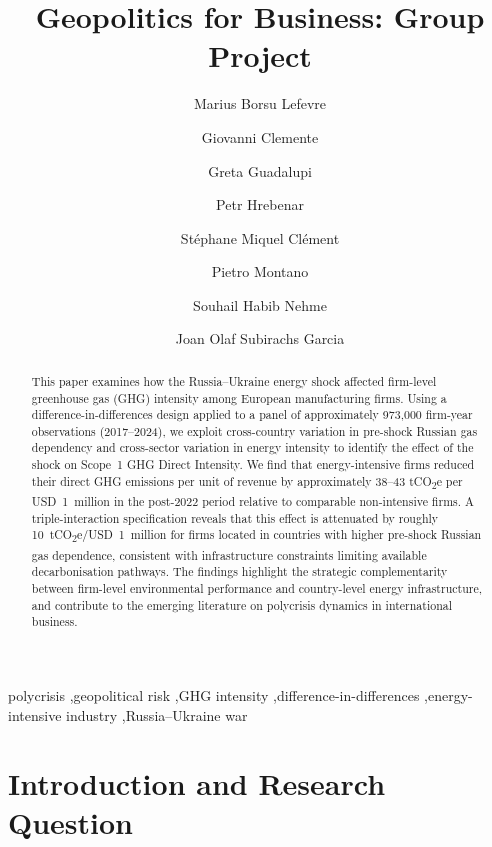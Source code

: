 \documentclass[authoryear,preprint,review,12pt]{elsarticle}
\begin{document}
\begin{frontmatter}

\title{Geopolitics for Business: Group Project}

\author[inst1]{Marius Borsu Lefevre}
\author[inst1]{Giovanni Clemente}
\author[inst1]{Greta Guadalupi}
\author[inst1]{Petr Hrebenar}
\author[inst1]{Stéphane Miquel Clément}
\author[inst1]{Pietro Montano}
\author[inst1]{Souhail Habib Nehme}
\author[inst1]{Joan Olaf Subirachs Garcia}

\address[inst1]{Data Group 2, [Institution Name], [City], [Country]}

\begin{abstract}
This paper examines how the Russia--Ukraine energy shock affected firm-level greenhouse gas (GHG) intensity among European manufacturing firms. Using a difference-in-differences design applied to a panel of approximately 973,000 firm-year observations (2017--2024), we exploit cross-country variation in pre-shock Russian gas dependency and cross-sector variation in energy intensity to identify the effect of the shock on Scope~1 GHG Direct Intensity. We find that energy-intensive firms reduced their direct GHG emissions per unit of revenue by approximately 38--43 tCO\textsubscript{2}e per USD~1~million in the post-2022 period relative to comparable non-intensive firms. A triple-interaction specification reveals that this effect is attenuated by roughly 10~tCO\textsubscript{2}e/USD~1~million for firms located in countries with higher pre-shock Russian gas dependence, consistent with infrastructure constraints limiting available decarbonisation pathways. The findings highlight the strategic complementarity between firm-level environmental performance and country-level energy infrastructure, and contribute to the emerging literature on polycrisis dynamics in international business.
\end{abstract}

\begin{keyword}
polycrisis \sep geopolitical risk \sep GHG intensity \sep difference-in-differences \sep energy-intensive industry \sep Russia--Ukraine war
\end{keyword}

\end{frontmatter}

\section{Introduction and Research Question}
\end{document}
